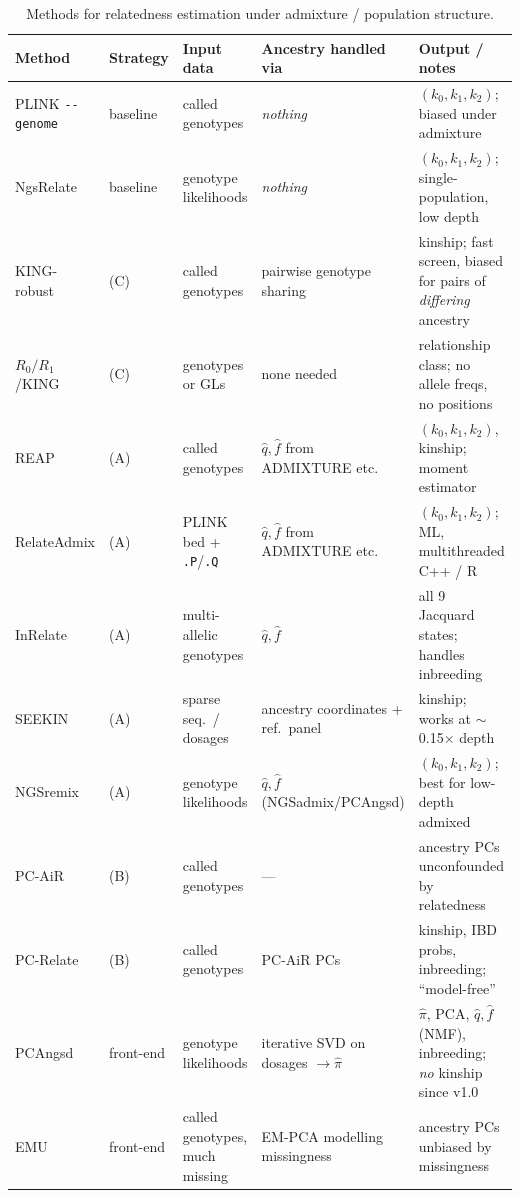 \documentclass[10pt,a4paper]{article}
\begin{document}
\begin{table}[t]
\centering
\small
\caption{Methods for relatedness estimation under admixture / population structure.}
\label{tab:methods}
\begin{tabular}{@{}>{\raggedright\arraybackslash}p{2.3cm} >{\raggedright\arraybackslash}p{1.5cm} >{\raggedright\arraybackslash}p{2.6cm} >{\raggedright\arraybackslash}p{3.1cm} >{\raggedright\arraybackslash}p{4.5cm}@{}}
\toprule
\textbf{Method} & \textbf{Strategy} & \textbf{Input data} & \textbf{Ancestry handled via} & \textbf{Output / notes} \\
\midrule
PLINK \texttt{-{}-genome} & baseline & called genotypes & \emph{nothing} & $(k_0,k_1,k_2)$; biased under admixture \\
NgsRelate & baseline & genotype likelihoods & \emph{nothing} & $(k_0,k_1,k_2)$; single-population, low depth \\
\addlinespace
KING-robust & (C) & called genotypes & pairwise genotype sharing & kinship; fast screen, biased for pairs of \emph{differing} ancestry \\
$R_0/R_1$/KING & (C) & genotypes or GLs & none needed & relationship class; no allele freqs, no positions \\
\addlinespace
REAP & (A) & called genotypes & $\hat q,\hat f$ from ADMIXTURE etc. & $(k_0,k_1,k_2)$, kinship; moment estimator \\
RelateAdmix & (A) & PLINK bed + \texttt{.P}/\texttt{.Q} & $\hat q,\hat f$ from ADMIXTURE etc. & $(k_0,k_1,k_2)$; ML, multithreaded C++ / R \\
InRelate & (A) & multi-allelic genotypes & $\hat q,\hat f$ & all 9 Jacquard states; handles inbreeding \\
SEEKIN & (A) & sparse seq.\ / dosages & ancestry coordinates + ref.\ panel & kinship; works at $\sim$0.15$\times$ depth \\
NGSremix & (A) & genotype likelihoods & $\hat q,\hat f$ (NGSadmix/PCAngsd) & $(k_0,k_1,k_2)$; best for low-depth admixed \\
\addlinespace
PC-AiR & (B) & called genotypes & --- & ancestry PCs unconfounded by relatedness \\
PC-Relate & (B) & called genotypes & PC-AiR PCs & kinship, IBD probs, inbreeding; ``model-free'' \\
PCAngsd & front-end & genotype likelihoods & iterative SVD on dosages $\rightarrow\hat\pi$ & $\hat\pi$, PCA, $\hat q,\hat f$ (NMF), inbreeding; \emph{no} kinship since v1.0 \\
EMU & front-end & called genotypes, much missing & EM-PCA modelling missingness & ancestry PCs unbiased by missingness \\

\end{tabular}
\end{table}
\end{document}
